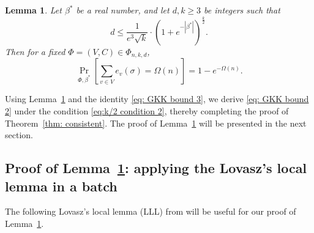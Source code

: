 \documentclass[11pt]{article}
\newtheorem{lemma}[theorem]{Lemma}
\theoremstyle{definition}
\theoremstyle{remark}
\begin{document}
\begin{lemma}
    \label{lem: flippable}
Let $\beta^*$ be a real number, and let $d,k\geq 3$ be integers such that 
    \begin{equation*}
        d\le \frac{1}{e^3\sqrt{k}} \cdot (1+e^{-|\beta^*|})^{\frac{k}{2}}.
    \end{equation*}
    Then for a fixed $\Phi=(V,C)\in \Phi_{n,k,d}$, 
    \begin{equation}\label{eq: many flippable}
         \Pr_{\Phi, \beta^*} \left[\sum_{v\in V} e_v(\sigma) = \Omega(n)\right] = 1- e^{-\Omega(n)}.
    \end{equation}
\end{lemma}
Using Lemma~\ref{lem: flippable} and the identity \eqref{eq: GKK bound 3}, we derive \eqref{eq: GKK bound 2} under the condition \eqref{eq:k/2 condition 2}, thereby completing the proof of Theorem~\ref{thm: consistent}. The proof of Lemma~\ref{lem: flippable} will be presented in the next section.

\subsection{Proof of Lemma~\ref{lem: flippable}: applying the Lovasz's local lemma in a batch} 
\label{sec: flippable}

The following Lovasz's local lemma (LLL) from \cite{GJL19} will be useful for our proof of Lemma~\ref{lem: flippable}.
\end{document}
